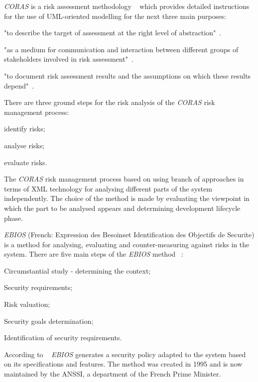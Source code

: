 \documentclass[12pt]{article}
\begin{document}
\textit{CORAS} is a risk assessment methodology ~\cite{CORAS} which provides detailed instructions for the use of UML-oriented modelling for the next three main purposes:
\begin{enumerate*}[label=(\roman*)]
  \item "to describe the target of assessment at the right level of abstraction"~\cite{CORAS}.
  \item "as a medium for communication and interaction between different groups of stakeholders involved in risk assessment"~\cite{CORAS}.
  \item "to document risk assessment results and the assumptions on which these results depend"~\cite{CORAS}.
\end{enumerate*}
There are three ground steps for the risk analysis of the \textit{CORAS} risk management process:
\begin{enumerate*}[label=(\roman*)]
	\item identify risks;
	\item analyse risks;
	\item evaluate risks.
\end{enumerate*} 
The \textit{CORAS} risk management process based on using branch of approaches in terms of XML technology for analysing different parts of the system independently. The choice of the method is made by evaluating the viewpoint in which the part to be analysed appears and  determining development lifecycle phase. 

\textit{EBIOS}  (French: Expression des Besoinset Identification des Objectifs de Securite) is a method for analysing, evaluating and counter-measuring against risks in the system. There are five main steps of the \textit{EBIOS} method ~\cite{EBIOS}:
\begin{enumerate*}[label=(\roman*)]
	\item Circumstantial study - determining the context;
	\item Security requirements;
	\item Risk valuation;
	\item Security goals determination; 
	\item Identification of security requirements.
\end{enumerate*}
According to ~\cite{EBIOS} \textit{EBIOS}  generates a security policy adapted to the system based on its specifications and features. The method was created in 1995 and is now maintained by the ANSSI, a department of the French Prime Minister.
\end{document}
